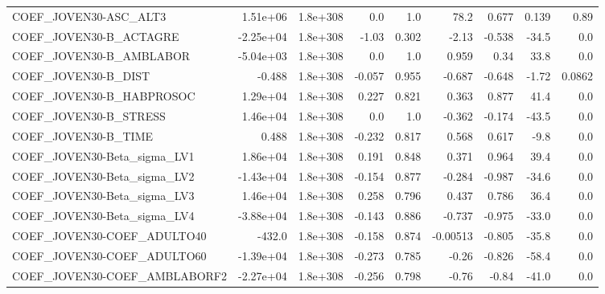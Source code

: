 \begin{tabular}{lrrrrrrrr}
COEF\_JOVEN30-ASC\_ALT3             &    1.51e+06 &     1.8e+308 &      0.0 &      1.0 &       78.2 &       0.677 &        0.139 &          0.89 \\
COEF\_JOVEN30-B\_ACTAGRE            &   -2.25e+04 &     1.8e+308 &    -1.03 &    0.302 &      -2.13 &      -0.538 &        -34.5 &           0.0 \\
COEF\_JOVEN30-B\_AMBLABOR           &   -5.04e+03 &     1.8e+308 &      0.0 &      1.0 &      0.959 &        0.34 &         33.8 &           0.0 \\
COEF\_JOVEN30-B\_DIST               &      -0.488 &     1.8e+308 &   -0.057 &    0.955 &     -0.687 &      -0.648 &        -1.72 &        0.0862 \\
COEF\_JOVEN30-B\_HABPROSOC          &    1.29e+04 &     1.8e+308 &    0.227 &    0.821 &      0.363 &       0.877 &         41.4 &           0.0 \\
COEF\_JOVEN30-B\_STRESS             &    1.46e+04 &     1.8e+308 &      0.0 &      1.0 &     -0.362 &      -0.174 &        -43.5 &           0.0 \\
COEF\_JOVEN30-B\_TIME               &       0.488 &     1.8e+308 &   -0.232 &    0.817 &      0.568 &       0.617 &         -9.8 &           0.0 \\
COEF\_JOVEN30-Beta\_sigma\_LV1       &    1.86e+04 &     1.8e+308 &    0.191 &    0.848 &      0.371 &       0.964 &         39.4 &           0.0 \\
COEF\_JOVEN30-Beta\_sigma\_LV2       &   -1.43e+04 &     1.8e+308 &   -0.154 &    0.877 &     -0.284 &      -0.987 &        -34.6 &           0.0 \\
COEF\_JOVEN30-Beta\_sigma\_LV3       &    1.46e+04 &     1.8e+308 &    0.258 &    0.796 &      0.437 &       0.786 &         36.4 &           0.0 \\
COEF\_JOVEN30-Beta\_sigma\_LV4       &   -3.88e+04 &     1.8e+308 &   -0.143 &    0.886 &     -0.737 &      -0.975 &        -33.0 &           0.0 \\
COEF\_JOVEN30-COEF\_ADULTO40        &      -432.0 &     1.8e+308 &   -0.158 &    0.874 &   -0.00513 &      -0.805 &        -35.8 &           0.0 \\
COEF\_JOVEN30-COEF\_ADULTO60        &   -1.39e+04 &     1.8e+308 &   -0.273 &    0.785 &      -0.26 &      -0.826 &        -58.4 &           0.0 \\
COEF\_JOVEN30-COEF\_AMBLABORF2      &   -2.27e+04 &     1.8e+308 &   -0.256 &    0.798 &      -0.76 &       -0.84 &        -41.0 &           0.0 \\

\end{tabular}
